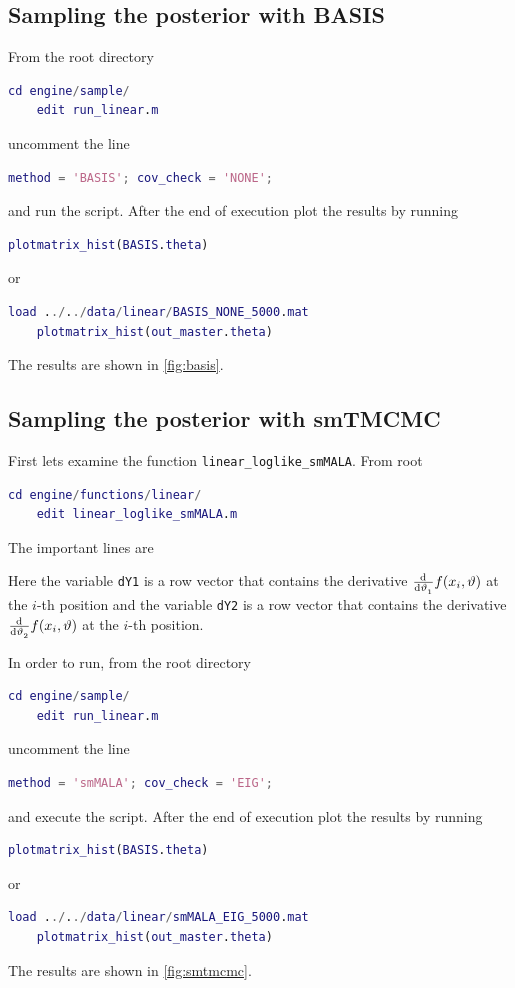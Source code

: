 \documentclass{article}
\begin{document}
\subsection{Sampling the posterior with BASIS}
From the root directory
%
\begin{lstlisting}[language=Matlab]
	cd engine/sample/
	edit run_linear.m
\end{lstlisting}
%
uncomment the line
%
\begin{lstlisting}[language=Matlab]
	method = 'BASIS'; cov_check = 'NONE';
\end{lstlisting}
%
and run the script. After the end of execution plot the results by running
%
\begin{lstlisting}[language=Matlab]
	plotmatrix_hist(BASIS.theta)
\end{lstlisting}
%
or
%
\begin{lstlisting}[language=Matlab]
	load ../../data/linear/BASIS_NONE_5000.mat
	plotmatrix_hist(out_master.theta)
\end{lstlisting}
%
The results are shown in \cref{fig:basis}.










\subsection{Sampling the posterior with smTMCMC}
First lets examine the function \verb|linear_loglike_smMALA|. From root
\begin{lstlisting}[language=Matlab]
	cd engine/functions/linear/
	edit linear_loglike_smMALA.m
\end{lstlisting}
%
The important lines are 
%

%
Here the variable \verb|dY1| is a row vector that contains the derivative $\od{}{\vartheta_1}f(x_i,\vartheta)$ at the $i$-th position and the variable \verb|dY2| is a row vector that contains the derivative $\od{}{\vartheta_2}f(x_i,\vartheta)$ at the $i$-th position.

In order to run, from the root directory
%
\begin{lstlisting}[language=Matlab]
	cd engine/sample/
	edit run_linear.m
\end{lstlisting}
%
uncomment the line
%
\begin{lstlisting}[language=Matlab]
	method = 'smMALA'; cov_check = 'EIG';
\end{lstlisting}
%
and execute the script.
%
After the end of execution plot the results by running
%
\begin{lstlisting}[language=Matlab]
	plotmatrix_hist(BASIS.theta)
\end{lstlisting}
%
or
%
\begin{lstlisting}[language=Matlab]
	load ../../data/linear/smMALA_EIG_5000.mat
	plotmatrix_hist(out_master.theta)
\end{lstlisting}
%
The results are shown in \cref{fig:smtmcmc}.
\end{document}

